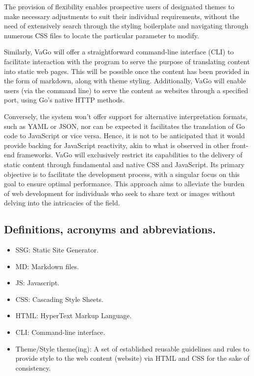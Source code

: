 The provision of flexibility enables prospective users of designated
themes to make necessary adjustments to suit their individual
requirements, without the need of extensively search through the styling
boilerplate and navigating through numerous CSS files to locate the
particular parameter to modify.

Similarly, VaGo will offer a straightforward command-line interface
(CLI)\cite{wikicli} to facilitate interaction with the program to serve the purpose of
translating content into static web pages. This will be possible once
the content has been provided in the form of markdown, along with theme
styling. Additionally, VaGo will enable users (via the command line) to
serve the content as websites through a specified port, using Go's
native HTTP methods.

Conversely, the system won't offer support for alternative
interpretation formats, such as YAML or JSON, nor can be expected it
facilitates the translation of Go code to JavaScript or vice versa.
Hence, it is not to be anticipated that it would provide backing for
JavaScript reactivity, akin to what is observed in other front-end
frameworks. VaGo will exclusively restrict its capabilities to the
delivery of static content through fundamental and native CSS and
JavaScript. Its primary objective is to facilitate the development
process, with a singular focus on this goal to ensure optimal
performance. This approach aims to alleviate the burden of web
development for individuals who seek to share text or images without
delving into the intricacies of the field.

\subsection{Definitions, acronyms and
abbreviations.}\label{subsubsec:definitions-acronyms-and-abbreviations.}

\begin{itemize}
    \item
    SSG: Static Site Generator.
    \item
    MD: Markdown files.
    \item
    JS: Javascript.
    \item
    CSS: Cascading Style Sheets.
    \item
    HTML: HyperText Markup Language.
    \item
    CLI: Command-line interface.
    \item
    Theme/Style theme(ing): A set of established reusable guidelines and
    rules to provide style to the web content (website) via HTML and CSS
    for the sake of consistency.
\end{itemize}


